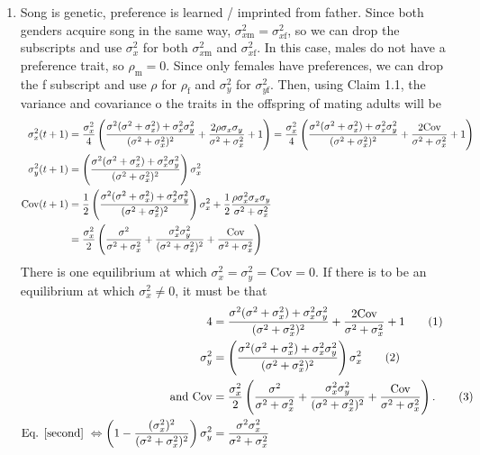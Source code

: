 \documentclass{article}
\newcommand{\x}[1]{\text{#1}}
\newcommand{\Cov}{\text{Cov}}
\newcommand\numberthis{\addtocounter{equation}{1}\tag{\theequation}}
\begin{document}
\begin{enumerate}
\item Song is genetic, preference is learned / imprinted from father. Since both genders acquire song in the same way, $\sigma_{x\x{m}}^2=\sigma_{x\x{f}}^2$, so we can drop the 
subscripts and use $\sigma_x^2$ for both $\sigma_{x\x{m}}^2$ and $\sigma_{x\x{f}}^2$. In this case, males do not have a preference trait, so $\rho_\x{m}=0$. Since only females have preferences, we can drop the f subscript and use $\rho$ for $\rho_\x{f}$ and $\sigma_y^2$ for $\sigma_{y\x{f}}^2$. Then, using Claim 1.1, the variance and covariance o the traits in the offspring of mating adults will be 
\begin{align}
\sigma_x^2(t+1)&=\frac{\sigma_x^2}{4}\left(\frac{\sigma^2(\sigma^2+\sigma_x^2)+\sigma_x^2\sigma_y^2}{(\sigma^2+\sigma_x^2)^2}+\frac{2\rho\sigma_x\sigma_y}{\sigma^2+\sigma_x^2}+1\right)=\frac{\sigma_x^2}{4}\left(\frac{\sigma^2(\sigma^2+\sigma_x^2)+\sigma_x^2\sigma_y^2}{(\sigma^2+\sigma_x^2)^2}+\frac{2\Cov }{\sigma^2+\sigma_x^2}+1\right) \label{sigmax8}
\\ \sigma_y^2(t+1)&=\left(\frac{\sigma^2(\sigma^2+\sigma_x^2)+\sigma_x^2\sigma_y^2}{(\sigma^2+\sigma_x^2)^2}\right)\sigma_x^2 \label{sigmay8}
\\ \Cov(t+1)&=\frac{1}{2}\left(\frac{\sigma^2(\sigma^2+\sigma_x^2)+\sigma_x^2\sigma_y^2}{(\sigma^2+\sigma_x^2)^2}\right)\sigma_x^2+\frac{1}{2}\frac{\rho\sigma_x^2\sigma_x\sigma_y}{\sigma^2+\sigma_x^2} \notag
\\&=\frac{\sigma_x^2}{2}\left(\frac{\sigma^2}{\sigma^2+\sigma_x^2}+\frac{\sigma_x^2\sigma_y^2}{(\sigma^2+\sigma_x^2)^2}+\frac{\Cov}{\sigma^2+\sigma_x^2}\right) \label{cov8}
\end{align}
There is one equilibrium at which $\sigma_x^2=\sigma_y^2=\Cov=0$. If there is to be an equilibrium at which $\sigma_x^2\neq 0$, it must be that
\begin{align*}
4&=\frac{\sigma^2(\sigma^2+\sigma_x^2)+\sigma_x^2\sigma_y^2}{(\sigma^2+\sigma_x^2)^2}+\frac{2\Cov }{\sigma^2+\sigma_x^2}+1 \numberthis \label{first} 
\\  \sigma_y^2&=\left(\frac{\sigma^2(\sigma^2+\sigma_x^2)+\sigma_x^2\sigma_y^2}{(\sigma^2+\sigma_x^2)^2}\right)\sigma_x^2 \numberthis \label{second}
\\ \text{ and } \Cov&=\frac{\sigma_x^2}{2}\left(\frac{\sigma^2}{\sigma^2+\sigma_x^2}+\frac{\sigma_x^2\sigma_y^2}{(\sigma^2+\sigma_x^2)^2}+\frac{\Cov}{\sigma^2+\sigma_x^2}\right).\numberthis  \label{third} 
\\ \text{Eq. \ref{second} } \Leftrightarrow \left(1-\frac{(\sigma_x^2)^2}{(\sigma^2+\sigma_x^2)^2}\right)\sigma_y^2&=\frac{\sigma^2\sigma_x^2}{\sigma^2+\sigma_x^2}

\end{align*}
\end{enumerate}
\end{document}
